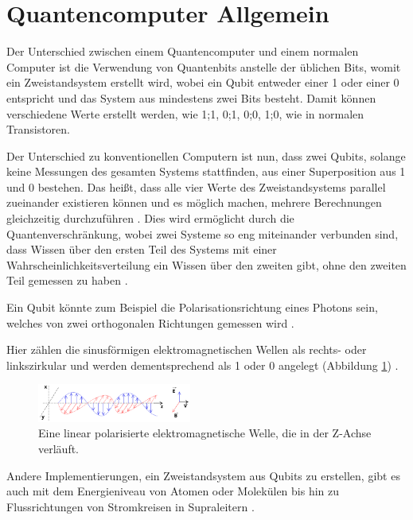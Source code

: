 \section{Quantencomputer Allgemein}
\label{sec:quantencomputer}
Der Unterschied zwischen einem Quantencomputer und einem normalen Computer ist die Verwendung von Quantenbits \cite{quantencomputer_2024} anstelle der üblichen Bits, womit ein Zweistandsystem \cite{zweizustandssystem_nodate} erstellt wird, wobei ein Qubit entweder einer 1 oder einer 0 entspricht und das System aus mindestens zwei Bits besteht. Damit können verschiedene Werte erstellt werden, wie 1;1, 0;1, 0;0, 1;0, wie in normalen Transistoren.

Der Unterschied zu konventionellen Computern ist nun, dass zwei Qubits, solange keine Messungen des gesamten Systems stattfinden, aus einer Superposition aus 1 und 0 bestehen. 
Das heißt, dass alle vier Werte des Zweistandsystems parallel zueinander existieren können und es möglich machen, mehrere Berechnungen gleichzeitig durchzuführen \cite{What_is_quantum_computing_nodate}.
Dies wird ermöglicht durch die Quantenverschränkung, wobei zwei Systeme so eng miteinander verbunden sind, dass Wissen über den ersten Teil des Systems mit einer Wahrscheinlichkeitsverteilung ein Wissen über den zweiten gibt, ohne den zweiten Teil gemessen zu haben \cite{quantenverschrankung_2024}.

Ein Qubit könnte zum Beispiel die Polarisationsrichtung eines Photons sein, welches von zwei orthogonalen Richtungen gemessen wird \cite{What_is_quantum_computing_nodate}. 

Hier zählen die sinusförmigen elektromagnetischen Wellen als rechts- 
oder linkszirkular und werden dementsprechend als 1 oder 0 angelegt (Abbildung \ref{fig:elektromagnetische_welle}) \cite{electromagnetic_2024}.

\begin{figure}[h]
    \centering
    \includegraphics[width=0.45\textwidth]{Onde_electromagnetique.svg.jpg}
    \caption{Eine linear polarisierte elektromagnetische Welle, die in der Z-Achse verläuft.}
    \label{fig:elektromagnetische_welle}
\end{figure}


Andere Implementierungen, ein Zweistandsystem aus Qubits zu erstellen, gibt es auch mit dem Energieniveau von Atomen oder Molekülen bis hin zu Flussrichtungen von Stromkreisen in Supraleitern \cite{supraleitung_nodate}.


